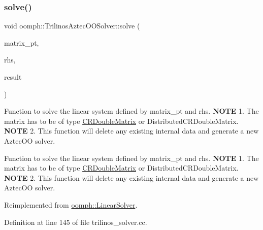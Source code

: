 \mbox{\label{classoomph_1_1TrilinosAztecOOSolver_a7d2853c49429224fc2deb3260340b190}} 
\subsubsection{\texorpdfstring{solve()}{solve()}\hspace{0.1cm}{\footnotesize\ttfamily [2/2]}}
{\footnotesize\ttfamily void oomph\+::\+Trilinos\+Aztec\+O\+O\+Solver\+::solve (\begin{DoxyParamCaption}\item[{\hyperlink{classoomph_1_1DoubleMatrixBase}{Double\+Matrix\+Base} $\ast$const \&}]{matrix\+\_\+pt,  }\item[{const \hyperlink{classoomph_1_1DoubleVector}{Double\+Vector} \&}]{rhs,  }\item[{\hyperlink{classoomph_1_1DoubleVector}{Double\+Vector} \&}]{result }\end{DoxyParamCaption})\hspace{0.3cm}{\ttfamily [virtual]}}



Function to solve the linear system defined by matrix\+\_\+pt and rhs. {\bfseries N\+O\+TE} 1. The matrix has to be of type \hyperlink{classoomph_1_1CRDoubleMatrix}{C\+R\+Double\+Matrix} or Distributed\+C\+R\+Double\+Matrix. {\bfseries N\+O\+TE} 2. This function will delete any existing internal data and generate a new Aztec\+OO solver. 

Function to solve the linear system defined by matrix\+\_\+pt and rhs. {\bfseries N\+O\+TE} 1. The matrix has to be of type \hyperlink{classoomph_1_1CRDoubleMatrix}{C\+R\+Double\+Matrix} or Distributed\+C\+R\+Double\+Matrix. {\bfseries N\+O\+TE} 2. This function will delete any existing internal data and generate a new Aztec\+OO solver. 

Reimplemented from \hyperlink{classoomph_1_1LinearSolver_a546c09822d18191df14caed864c04c09}{oomph\+::\+Linear\+Solver}.



Definition at line 145 of file trilinos\+\_\+solver.\+cc.



